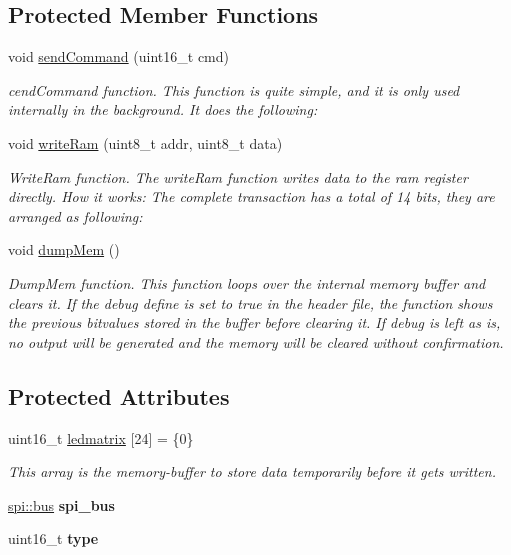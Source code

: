 \subsection*{Protected Member Functions}
\begin{DoxyCompactItemize}
\item 
void \hyperlink{group___h_t__1632_ga4e49c60cb79e44ba9f67d33c1986b5e6}{send\+Command} (uint16\+\_\+t cmd)
\begin{DoxyCompactList}\small\item\em cend\+Command function. This function is quite simple, and it is only used internally in the background. It does the following\+: \end{DoxyCompactList}\item 
void \hyperlink{group___h_t__1632_gac3d327b762c8245ddc6f88ba26c46e82}{write\+Ram} (uint8\+\_\+t addr, uint8\+\_\+t data)
\begin{DoxyCompactList}\small\item\em Write\+Ram function. The write\+Ram function writes data to the ram register directly. How it works\+: The complete transaction has a total of 14 bits, they are arranged as following\+: \end{DoxyCompactList}\item 
void \hyperlink{group___h_t__1632_ga7125530a962e17d9a533453e10d19e15}{dump\+Mem} ()
\begin{DoxyCompactList}\small\item\em Dump\+Mem function. This function loops over the internal memory buffer and clears it. If the \textquotesingle{}debug\textquotesingle{} define is set to true in the header file, the function shows the previous bitvalues stored in the buffer before clearing it. If debug is left as is, no output will be generated and the memory will be cleared without confirmation. \end{DoxyCompactList}\end{DoxyCompactItemize}
\subsection*{Protected Attributes}
\begin{DoxyCompactItemize}
\item 
uint16\+\_\+t \hyperlink{group___h_t__1632_gaaa0ec3078d91783cb444a6d22e365d0f}{ledmatrix} \mbox{[}24\mbox{]} = \{0\}
\begin{DoxyCompactList}\small\item\em This array is the memory-\/buffer to store data temporarily before it gets written. \end{DoxyCompactList}\item 
\hyperlink{classspi_1_1bus}{spi\+::bus} {\bfseries spi\+\_\+bus}
\item 
uint16\+\_\+t {\bfseries type}
\end{DoxyCompactItemize}
